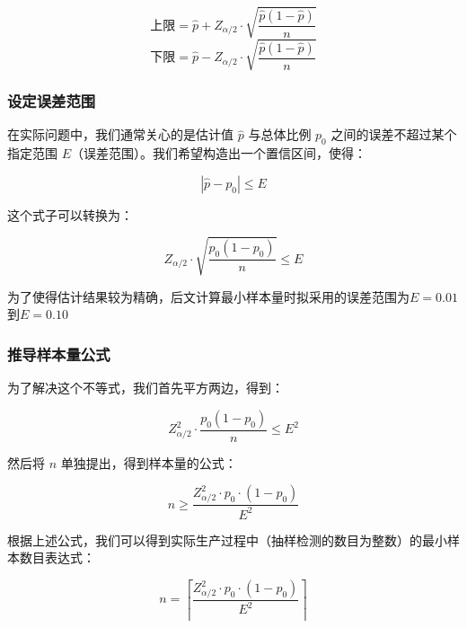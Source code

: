 \documentclass[utf8]{ctexart} %
\begin{document}
		\[
		\text{上限} = \hat{p} + Z_{\alpha/2} \cdot \sqrt{\frac{\hat{p}(1 - \hat{p})}{n}}
		\]
		\[
		\text{下限} = \hat{p} - Z_{\alpha/2} \cdot \sqrt{\frac{\hat{p}(1 - \hat{p})}{n}}
		\]
		
		\subsubsection{设定误差范围}
		在实际问题中，我们通常关心的是估计值 \( \hat{p} \) 与总体比例 \( p_0 \) 之间的误差不超过某个指定范围 \( E \)（误差范围）。我们希望构造出一个置信区间，使得：
		
		\[
		|\hat{p} - p_0| \leq E
		\]
		
		这个式子可以转换为：
		
		\[
		Z_{\alpha/2} \cdot \sqrt{\frac{p_0(1 - p_0)}{n}} \leq E
		\]
		
		为了使得估计结果较为精确，后文计算最小样本量时拟采用的误差范围为\( E = 0.01	\)到\( E = 0.10	\)
		\subsubsection{推导样本量公式}
		为了解决这个不等式，我们首先平方两边，得到：
		
		\[
		Z_{\alpha/2}^2 \cdot \frac{p_0(1 - p_0)}{n} \leq E^2
		\]
		
		然后将 \( n \) 单独提出，得到样本量的公式：
		
		\[
		n \geq \frac{Z_{\alpha/2}^2 \cdot p_0 \cdot (1 - p_0)}{E^2}
		\]
		
		根据上述公式，我们可以得到实际生产过程中（抽样检测的数目为整数）的最小样本数目表达式：
		
		\begin{equation}
			n = \left\lceil \frac{Z_{\alpha/2}^2 \cdot p_0 \cdot (1 - p_0)}{E^2} \right\rceil
			\label{eq:1}
		\end{equation}
		
\end{document}
